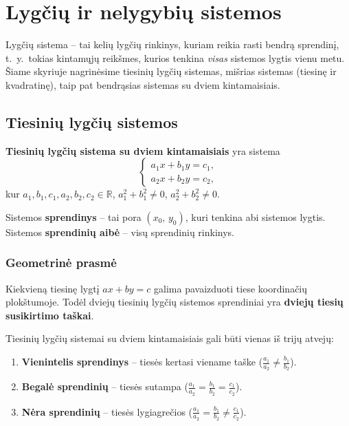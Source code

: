 \section{Lygčių ir nelygybių sistemos}

Lygčių sistema -- tai kelių lygčių rinkinys, kuriam reikia rasti bendrą sprendinį, t.~y.\ tokias kintamųjų reikšmes, kurios tenkina \emph{visas} sistemos lygtis vienu metu. Šiame skyriuje nagrinėsime tiesinių lygčių sistemas, mišrias sistemas (tiesinę ir kvadratinę), taip pat bendrąsias sistemas su dviem kintamaisiais.

\subsection{Tiesinių lygčių sistemos}

\begin{definition}
\textbf{Tiesinių lygčių sistema su dviem kintamaisiais} yra sistema
\[
  \begin{cases}
    a_1 x + b_1 y = c_1,\\
    a_2 x + b_2 y = c_2,
  \end{cases}
\]
kur $a_1, b_1, c_1, a_2, b_2, c_2 \in \mathbb{R}$, $a_1^2 + b_1^2 \neq 0$, $a_2^2 + b_2^2 \neq 0$.
\end{definition}

\begin{definition}
Sistemos \textbf{sprendinys} -- tai pora $(x_0,\, y_0)$, kuri tenkina abi sistemos lygtis. Sistemos \textbf{sprendinių aibė} -- visų sprendinių rinkinys.
\end{definition}

\subsubsection*{Geometrinė prasmė}

Kiekvieną tiesinę lygtį $ax + by = c$ galima pavaizduoti tiese koordinačių plokštumoje. Todėl dviejų tiesinių lygčių sistemos sprendiniai yra \textbf{dviejų tiesių susikirtimo taškai}.

\begin{theorem}
Tiesinių lygčių sistemai su dviem kintamaisiais gali būti vienas iš trijų atvejų:
\begin{enumerate}[label=\arabic*.]
  \item \textbf{Vienintelis sprendinys} -- tiesės kertasi viename taške ($\frac{a_1}{a_2} \neq \frac{b_1}{b_2}$).
  \item \textbf{Begalė sprendinių} -- tiesės sutampa ($\frac{a_1}{a_2} = \frac{b_1}{b_2} = \frac{c_1}{c_2}$).
  \item \textbf{Nėra sprendinių} -- tiesės lygiagrečios ($\frac{a_1}{a_2} = \frac{b_1}{b_2} \neq \frac{c_1}{c_2}$).
\end{enumerate}
\end{theorem}

